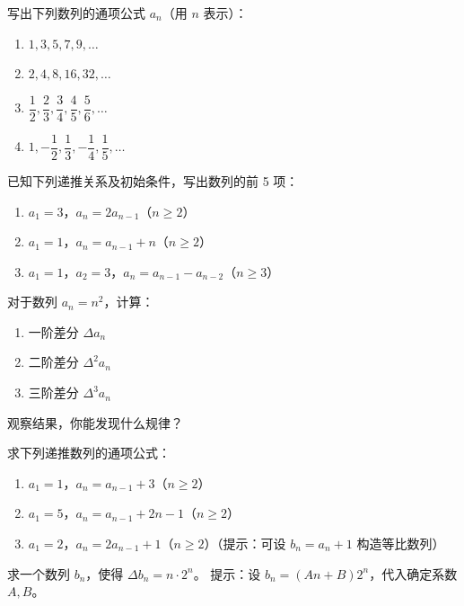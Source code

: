 \documentclass[fontset=fandol]{ctexart}
\begin{document}
\begin{exercise}写出下列数列的通项公式 \(a_n\)（用 \(n\) 表示）：
\begin{enumerate}
\item \(1, 3, 5, 7, 9, \dots\)
\item \(2, 4, 8, 16, 32, \dots\)
\item \(\dfrac{1}{2}, \dfrac{2}{3}, \dfrac{3}{4}, \dfrac{4}{5}, \dfrac{5}{6}, \dots\)
\item \(1, -\dfrac{1}{2}, \dfrac{1}{3}, -\dfrac{1}{4}, \dfrac{1}{5}, \dots\)
\end{enumerate}
\end{exercise}

\begin{exercise}已知下列递推关系及初始条件，写出数列的前 5 项：
\begin{enumerate}
\item \(a_1 = 3\)，\(a_n = 2a_{n-1}\)（\(n \geq 2\)）
\item \(a_1 = 1\)，\(a_n = a_{n-1} + n\)（\(n \geq 2\)）
\item \(a_1 = 1\)，\(a_2 = 3\)，\(a_n = a_{n-1} - a_{n-2}\)（\(n \geq 3\)）
\end{enumerate}
\end{exercise}

\begin{exercise}对于数列 \(a_n = n^2\)，计算：
\begin{enumerate}
\item 一阶差分 \(\Delta a_n\)
\item 二阶差分 \(\Delta^2 a_n\)
\item 三阶差分 \(\Delta^3 a_n\)
\end{enumerate}
观察结果，你能发现什么规律？
\end{exercise}

\begin{exercise}求下列递推数列的通项公式：
\begin{enumerate}
\item \(a_1 = 1\)，\(a_n = a_{n-1} + 3\)（\(n \geq 2\)）
\item \(a_1 = 5\)，\(a_n = a_{n-1} + 2n - 1\)（\(n \geq 2\)）
\item \(a_1 = 2\)，\(a_n = 2a_{n-1} + 1\)（\(n \geq 2\)）\quad（提示：可设 \(b_n = a_n + 1\) 构造等比数列）
\end{enumerate}
\end{exercise}

\begin{exercise}求一个数列 \(b_n\)，使得 \(\Delta b_n = n \cdot 2^n\)。
提示：设 \(b_n = (An + B)2^n\)，代入确定系数 \(A, B\)。
\end{exercise}
\end{document}
